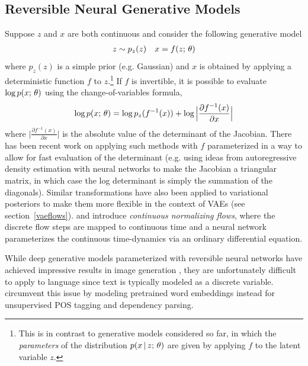 \documentclass{article}
\begin{document}
\subsection{Reversible Neural Generative Models}\label{flows}
Suppose $z$ and $x$ are both continuous and consider the following generative model
\begin{align*}
    z \sim p_z(z) && x =  f(z ; \, \theta)
\end{align*}
where $p_z(z)$ is a simple prior (e.g. Gaussian) and $x$ is obtained by applying a deterministic function $f$ to $z$.\footnote{This is in contrast to generative models
considered so far, in which the \emph{parameters} of the distribution $p(x \,|\, z ; \, \theta)$
are given by applying $f$ to the latent variable $z$.}
If $f$ is invertible, it is possible to evaluate $\log p(x ; \, \theta)$ using the change-of-variables formula,
\[ \log p(x ; \, \theta)  = \log  p_z(f^{-1}(x)) + \log \Big|\frac{\partial f^{-1}(x)}{\partial x}\Big| \]
where $ \Big|\frac{\partial f^{-1}(x)}{\partial x}\Big| $ is the absolute value of the 
determinant of the Jacobian. 
There has been recent work \citep{dinh2015,dinh2017,papamakarios2017, kingma2018} on applying such methods with $f$ parameterized in a way to allow for fast evaluation of the determinant (e.g. using ideas from 
autoregressive density estimation with neural networks \citep{larochelle2011,germain2015} to make the Jacobian a triangular matrix, in which case the log determinant is simply the summation of the diagonals). Similar transformations have also been applied to variational posteriors to make them more flexible in the context of VAEs \citep{Rezende2015,Kingma2016} (see section~\ref{vaeflows}).
\cite{chen2018ode} and \cite{grathwohl2018ffjord} introduce \emph{continuous normalizing flows}, where the discrete flow steps are mapped to continuous time and a neural network parameterizes the continuous time-dynamics via an ordinary differential equation.

While deep generative models parameterized with reversible neural networks have achieved impressive results in image generation \citep{dinh2017,kingma2018}, they are unfortunately difficult to apply to language since text is typically modeled as a discrete variable. \cite{he2018} circumvent this issue by modeling pretrained word embeddings instead for unsupervised POS tagging and dependency parsing.
\end{document}
